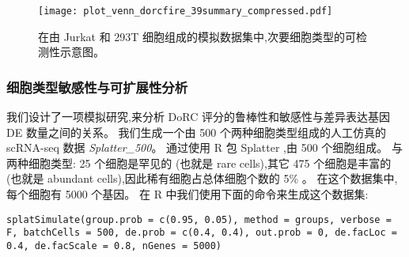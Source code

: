 \begin{figure}[!htbp]
    \centering
    \texttt{[image: plot\_venn\_dorcfire\_39summary\_compressed.pdf]}
    \caption{
    在由 Jurkat 和 293T 细胞组成的模拟数据集中,次要细胞类型的可检测性示意图。
    }
    \label{fig:jurkat}
\end{figure}

\subsubsection{细胞类型敏感性与可扩展性分析}


我们设计了一项模拟研究,来分析 DoRC 评分的鲁棒性和敏感性与差异表达基因 DE 数量之间的关系。
我们生成一个由 500 个两种细胞类型组成的人工仿真的 scRNA-seq 数据 \textit{Splatter\_500}。
通过使用 R 包 Splatter ,由 500 个细胞组成。
与两种细胞类型: 25 个细胞是罕见的 (也就是 rare cells),其它 475 个细胞是丰富的 (也就是 abundant cells),因此稀有细胞占总体细胞个数的 5\% 。
在这个数据集中,每个细胞有 5000 个基因。
在 R 中我们使用下面的命令来生成这个数据集:

\texttt{splatSimulate(group.prob = c(0.95, 0.05), method = groups, 
verbose = F, batchCells = 500, de.prob = c(0.4, 0.4), out.prob = 0, 
de.facLoc = 0.4, de.facScale = 0.8, nGenes = 5000)}

